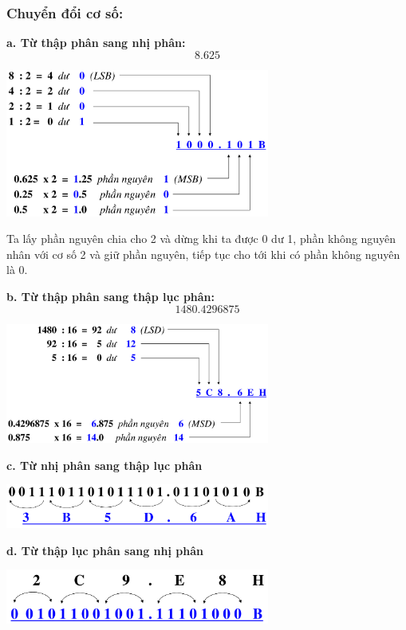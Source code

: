 \subsubsection{Chuyển đổi cơ số:}
\noindent\textbf{a. Từ thập phân sang nhị phân:}
\newpage
\[
  8.625  
\]
\begin{center}
    \includegraphics[width = 0.65\textwidth]{./local/image/1.png}
\end{center}
Ta lấy phần nguyên chia cho 2 và dừng khi ta được 0 dư 1, phần không nguyên nhân với cơ số 2 và giữ phần nguyên, tiếp tục cho tới khi có phần không nguyên là 0.

\noindent\textbf{b. Từ thập phân sang thập lục phân:}
\[
    1480.4296875
\]
\begin{center}
    \includegraphics[width = 0.65\textwidth]{./local/image/2.png}
\end{center}
\textbf{c. Từ nhị phân sang thập lục phân}
\begin{center}
    \includegraphics[width = 0.65\textwidth]{./local/image/3.png}
\end{center}
\textbf{d. Từ thập lục phân sang nhị phân}
\begin{center}
    \includegraphics[width = 0.65\textwidth]{./local/image/4.png}
\end{center}
